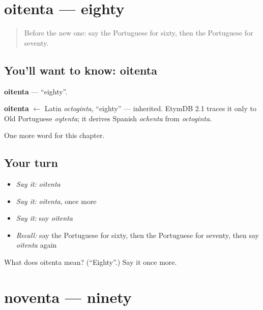 \section[oitenta]{oitenta — eighty}

\label{lesson:PT-C130-oitenta}



\begin{quote}
Before the new one: say the Portuguese for sixty, then the Portuguese for seventy.
\end{quote}

\subsection*{You'll want to know: oitenta}
\textbf{oitenta} — \textquotedblleft{}eighty\textquotedblright{}.

\begin{cousinweb}
\textbf{oitenta} $\leftarrow$ Latin \emph{octoginta}, \textquotedblleft{}eighty\textquotedblright{} — inherited. EtymDB 2.1 traces it only to Old Portuguese \emph{oytenta}; it derives Spanish \emph{ochenta} from \emph{octoginta}.
\end{cousinweb}

\begin{grammarlens}[title={What you've built}]
One more word for this chapter.
\end{grammarlens}

\subsection*{Your turn}
\begin{itemize}
\raggedright
  \item \emph{Say it:} \emph{oitenta}
  \item \emph{Say it:} \emph{oitenta}, once more
  \item \emph{Say it:} say \emph{oitenta}
  \item \emph{Recall:} say the Portuguese for sixty, then the Portuguese for seventy, then say \emph{oitenta} again
\end{itemize}

\begin{tcolorbox}[breakable,colback=teal!4,colframe=teal!35!black,title={Before you move on}]
What does oitenta mean? (\textquotedblleft{}Eighty\textquotedblright{}.) Say it once more.
\end{tcolorbox}
\section[noventa]{noventa — ninety}

